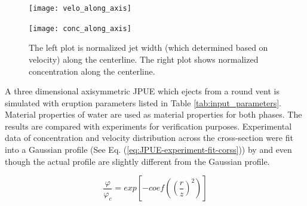 \documentclass[gmd, manuscript]{copernicus}
\begin{document}
\begin{figure}[!htb]
    \centering
    \begin{minipage}{.425\textwidth}
        \centering
        \texttt{[image: velo\_along\_axis]}
    \end{minipage}%
    \begin{minipage}{.425 \textwidth}
        \centering
        \texttt{[image: conc\_along\_axis]}
    \end{minipage}%
    \caption{The left plot is normalized jet width (which determined based on velocity) along the centerline. The right plot shows normalized concentration along the centerline.}
    \label{fig:JPUE_along-axis}
\end{figure}
%
%


A three dimensional axisymmetric JPUE which ejects from a round vent is simulated with eruption parameters listed in Table \ref{tab:input_parameters}. Material properties of water are used as material properties for both phases. The results are compared with experiments \citep {george1977turbulence, papanicolaou1988investigations} for verification purposes. Experimental data of concentration and velocity distribution across the cross-section were fit into a Gaussian profile (See Eq. (\ref{eq:JPUE-experiment-fit-corss})) by \citet{papanicolaou1988investigations} and  \citet{ george1977turbulence} even though the actual profile are slightly different from the Gaussian profile.

\begin{equation}
\dfrac{\varphi}{\varphi_c}=exp \left[-coef\left( \left(\dfrac{r}{z}\right)^2\right)\right]
\label{eq:JPUE-experiment-fit-corss}
\end{equation}
\end{document}
